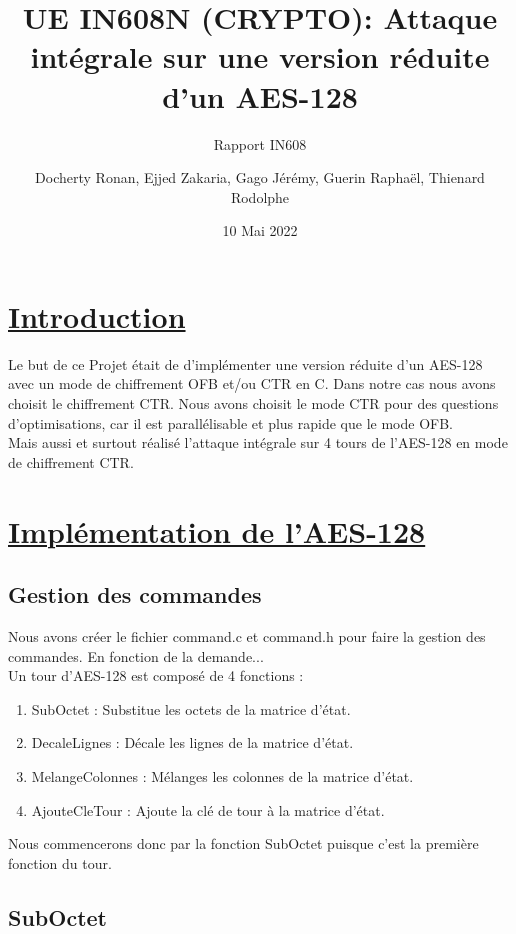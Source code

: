 \documentclass[french, 12pt]{article}
\title{UE IN608N (CRYPTO): Attaque intégrale sur une
	version réduite d’un AES-128 }
\subtitle{Rapport IN608}
\author{\hspace{-2cm}Docherty Ronan, Ejjed Zakaria, Gago Jérémy, Guerin Raphaël, Thienard Rodolphe}
\date{10 Mai 2022}
\begin{document}
	\maketitle
	\newpage

	\section{\underline{Introduction}}

	Le but de ce Projet était de d'implémenter une version réduite d'un AES-128 avec un mode de chiffrement OFB et/ou CTR en C. Dans notre cas nous avons choisit le chiffrement CTR. Nous avons choisit le mode CTR pour des questions d'optimisations, car il est parallélisable et plus rapide que le mode OFB.\\
	Mais aussi et surtout réalisé l'attaque intégrale sur 4 tours de l'AES-128 en mode de chiffrement CTR.
	 
	\section{\underline{Implémentation de l'AES-128}}
	\subsection*{Gestion des commandes}
	
	Nous avons créer le fichier command.c et command.h pour faire la gestion des commandes. En fonction de la demande... \\
	
	Un tour d'AES-128 est composé de 4 fonctions : 
	
	
	\begin{enumerate}
		\item SubOctet : Substitue les octets de la matrice d'état.
		\item DecaleLignes : Décale les lignes de la matrice d'état.
		\item MelangeColonnes : Mélanges les colonnes de la matrice d'état.
		\item AjouteCleTour : Ajoute la clé de tour à la matrice d'état.
	\end{enumerate}
  	 
	 Nous commencerons donc par la fonction SubOctet puisque c'est la première fonction du tour.
	
	\subsection*{SubOctet}
\end{document}

